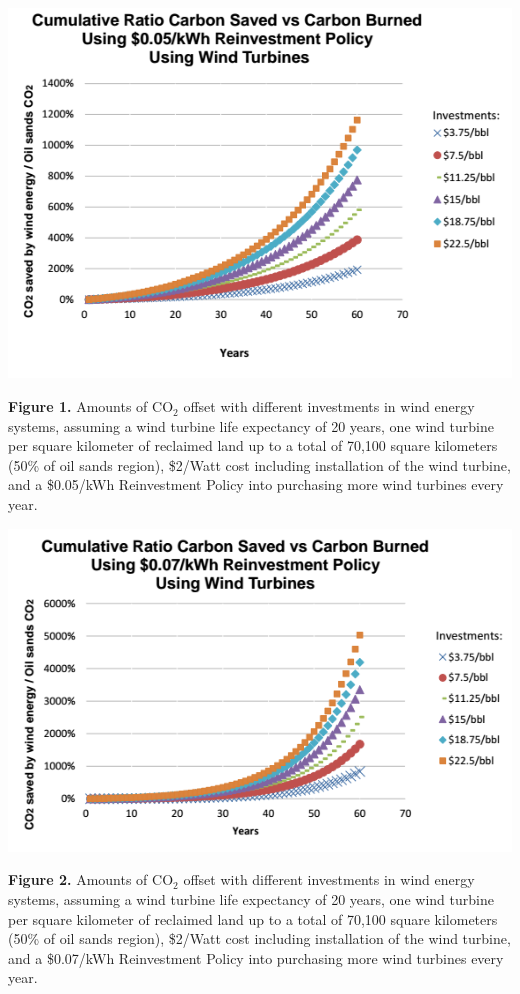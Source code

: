 \documentclass[11pt]{article}
\begin{document}
\begin{center}
\includegraphics[scale=0.65]{g1.png}
\end{center}
{\bf Figure 1.} Amounts of CO$_2$ offset with different investments in wind energy systems, assuming a wind turbine life expectancy of 20 years, one wind turbine per square kilometer of reclaimed land up to a total of 70,100 square kilometers (50\% of oil sands region), \$2/Watt cost including installation of the wind turbine, and a \$0.05/kWh Reinvestment Policy into purchasing more wind turbines every year.

\begin{center}
\includegraphics[scale=0.65]{g2.png}
\end{center}
{\bf Figure 2.}  Amounts of CO$_2$ offset with different investments in wind energy systems, assuming a wind turbine life expectancy of 20 years, one wind turbine per square kilometer of reclaimed land up to a total of 70,100 square kilometers (50\% of oil sands region), \$2/Watt cost including installation of the wind turbine, and a \$0.07/kWh Reinvestment Policy into purchasing more wind turbines every year.
\end{document}
